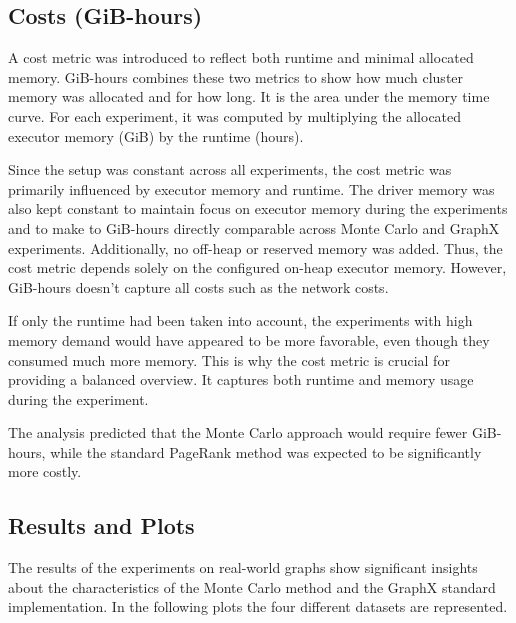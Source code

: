\subsection{Costs (GiB-hours)}
A cost metric was introduced to reflect both runtime and minimal allocated memory. GiB-hours combines these two metrics to show how much cluster memory was allocated and for how long. It is the area under the memory time curve. For each experiment, it was computed by multiplying the allocated executor memory (GiB) by the runtime (hours). \par
Since the setup was constant across all experiments, the cost metric was primarily influenced by executor memory and runtime. The driver memory was also kept constant to maintain focus on executor memory during the experiments and to make to GiB-hours directly comparable across Monte Carlo and GraphX experiments. Additionally, no off-heap or reserved memory was added. Thus, the cost metric depends solely on the configured on-heap executor memory. However, GiB-hours doesn't capture all costs such as the network costs.\par
If only the runtime had been taken into account, the experiments with high memory demand would have appeared to be more favorable, even though they consumed much more memory. This is why the cost metric is crucial for providing a balanced overview. It captures both runtime and memory usage during the experiment. \par
The analysis predicted that the Monte Carlo approach would require fewer GiB-hours, while the standard PageRank method was expected to be significantly more costly.


\subsection{Results and Plots}

The results of the experiments on real-world graphs show significant insights about the characteristics of the Monte Carlo method and the GraphX standard implementation. In the following plots the four different datasets are represented.\par

